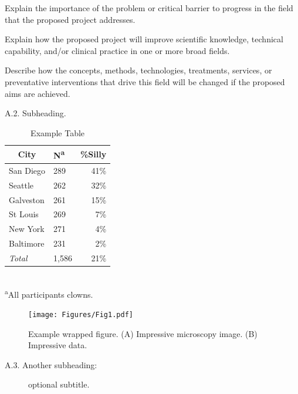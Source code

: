 \documentclass[11pt,notitlepage]{article}
\begin{document}
Explain the importance of the problem or critical barrier to progress in the field that the proposed project addresses.

Explain how the proposed project will improve scientific knowledge, technical capability, and/or clinical practice in one or more broad fields.

Describe how the concepts, methods, technologies, treatments, services, or preventative interventions that drive this field will be changed if the proposed aims are achieved.

\begin{description}
\item[A.2. Subheading.]{}
\end{description}

\begin{table} %
\caption{Example Table}
\begin{center}
\begin{tabular}{l l r}
\toprule
\multicolumn{1}{c}{City} & {N\textsuperscript{a}} & {\%Silly}\\
\midrule
San Diego & 289 & 41\%\\
Seattle & 262 & 32\%\\
Galveston & 261 & 15\%\\
St Louis & 269 & 7\%\\
New York & 271 & 4\%\\
Baltimore & 231 & 2\%\\
\emph{Total} & 1,586 & 21\%\\
\hline 
\end{tabular}\\
\footnotesize\textsuperscript{a}{All participants clowns.}
\end{center}
\label{default}
\end{table}

\lipsum[8-10]

\begin{figure} %
\texttt{[image: Figures/Fig1.pdf]}
\caption{\footnotesize Example wrapped figure. (A) Impressive microscopy image. (B) Impressive data.}
\end{figure}

\lipsum[5]

\begin{description}
\item[A.3. Another subheading:]{optional subtitle.}
\end{description}
\end{document}
